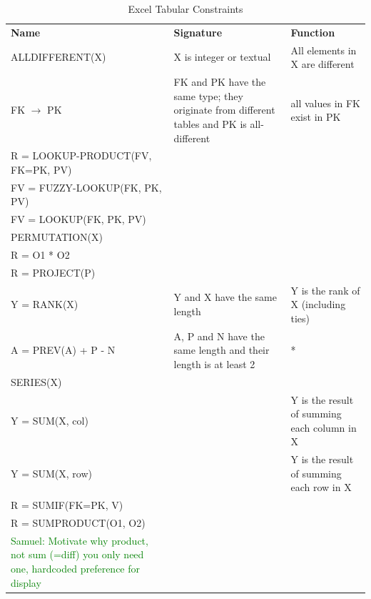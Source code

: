 \documentclass{ecai}
\newcommand{\samuel}[1]{\textcolor{green}{{\sc Samuel:} #1}\xspace}
\newcommand{\constraints}{\ensuremath{\mathcal{C}}\xspace}
\newcommand{\format}[1]{\textit{#1}\xspace}
\newcommand{\extractgroups}{\format{extractGroups}}
\newcommand{\extracttables}{\format{extractTables}}
\newcommand{\learnconstraints}{\format{learnConstraints}}
\newcommand{\CName}{Name\xspace}
\newcommand{\CSignature}{Signature\xspace}
\newcommand{\CFunction}{Function\xspace}
\newcommand{\dependencies}{\ensuremath{\mathcal{D}}\xspace}
\begin{document}
\begin{table}
  \centering
  \begin{tabularx}{\textwidth}{XXX}
    \textbf{\CName} & \textbf{\CSignature} & \textbf{\CFunction}\\
    ALLDIFFERENT(X) & X is integer or textual & All elements in X are different \\
    FK $\rightarrow$ PK & FK and PK have the same type; they originate from different tables and PK is all-different & all values in FK exist in PK \\
    R = LOOKUP-PRODUCT(FV, FK=PK, PV) & & \\
    FV = FUZZY-LOOKUP(FK, PK, PV) & & \\
    FV = LOOKUP(FK, PK, PV) & & \\
    PERMUTATION(X) & & \\
    R = O1 * O2 & & \\
    R = PROJECT(P) & & \\
    Y = RANK(X) & Y and X have the same length & Y is the rank of X (including ties)\\
    A = PREV(A) + P - N & A, P and N have the same length and their length is at least 2 & *\\
    SERIES(X) & & \\
    Y = SUM(X, col) & & Y is the result of summing each column in X \\
    Y = SUM(X, row) & & Y is the result of summing each row in X \\
    R = SUMIF(FK=PK, V) & & \\
    R = SUMPRODUCT(O1, O2) & & \\

\samuel{Motivate why product, not sum (=diff) you only need one, hardcoded preference for display}

  \end{tabularx}
  \caption{Excel Tabular Constraints}
  \label{table:constraints}
\end{table}

\end{document}
